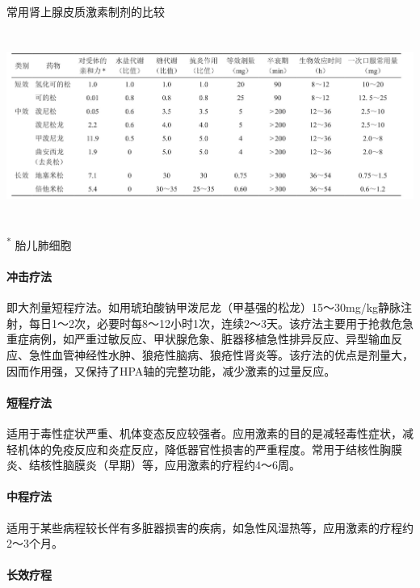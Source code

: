 \begin{table}[htbp]
\centering
\caption{常用肾上腺皮质激素制剂的比较}
\label{tab153-1}
\includegraphics[width=6.73958in,height=2.42708in]{./images/Image00586.jpg}
\end{table}

\textsuperscript{*} 胎儿肺细胞

\paragraph{冲击疗法}

即大剂量短程疗法。如用琥珀酸钠甲泼尼龙（甲基强的松龙）15～30mg/kg静脉注射，每日1～2次，必要时每8～12小时1次，连续2～3天。该疗法主要用于抢救危急重症病例，如严重过敏反应、甲状腺危象、脏器移植急性排异反应、异型输血反应、急性血管神经性水肿、狼疮性脑病、狼疮性肾炎等。该疗法的优点是剂量大，因而作用强，又保持了HPA轴的完整功能，减少激素的过量反应。

\paragraph{短程疗法}

适用于毒性症状严重、机体变态反应较强者。应用激素的目的是减轻毒性症状，减轻机体的免疫反应和炎症反应，降低器官性损害的严重程度。常用于结核性胸膜炎、结核性脑膜炎（早期）等，应用激素的疗程约4～6周。

\paragraph{中程疗法}

适用于某些病程较长伴有多脏器损害的疾病，如急性风湿热等，应用激素的疗程约2～3个月。

\paragraph{长效疗程}

